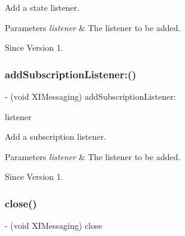 Add a state listener. 


\begin{DoxyParams}{Parameters}
{\em listener} & The listener to be added. \\
\hline
\end{DoxyParams}
\begin{DoxySince}{Since}
Version 1. 
\end{DoxySince}
\hypertarget{protocol_x_i_messaging_01-p_aadf39a52055ddbd35e9bfc4ce0a84d72}{}\label{protocol_x_i_messaging_01-p_aadf39a52055ddbd35e9bfc4ce0a84d72} 
\subsubsection{\texorpdfstring{add\+Subscription\+Listener\+:()}{addSubscriptionListener:()}}
{\footnotesize\ttfamily -\/ (void X\+I\+Messaging) add\+Subscription\+Listener\+: \begin{DoxyParamCaption}\item[{(id$<$ X\+I\+Messaging\+Subscription\+Listener $>$)}]{listener }\end{DoxyParamCaption}}



Add a subscription listener. 


\begin{DoxyParams}{Parameters}
{\em listener} & The listener to be added. \\
\hline
\end{DoxyParams}
\begin{DoxySince}{Since}
Version 1. 
\end{DoxySince}
\hypertarget{protocol_x_i_messaging_01-p_a60fca9e3ce704b7b34a28bfecab21eae}{}\label{protocol_x_i_messaging_01-p_a60fca9e3ce704b7b34a28bfecab21eae} 
\subsubsection{\texorpdfstring{close()}{close()}}
{\footnotesize\ttfamily -\/ (void X\+I\+Messaging) close \begin{DoxyParamCaption}{ }\end{DoxyParamCaption}}



